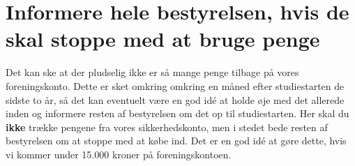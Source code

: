 \section{Informere hele bestyrelsen, hvis de skal stoppe med at bruge penge}
Det kan ske at der pludselig ikke er så mange penge tilbage på vores foreningskonto. Dette er sket omkring omkring en måned efter studiestarten de sidste to år, så det kan eventuelt være en god idé at holde øje med det allerede inden og informere resten af bestyrelsen om det op til studiestarten. Her skal du \textbf{ikke} trække pengene fra vores sikkerhedskonto, men i stedet bede resten af bestyrelsen om at stoppe med at købe ind. Det er en god idé at gøre dette, hvis vi kommer under 15.000 kroner på foreningskontoen.



